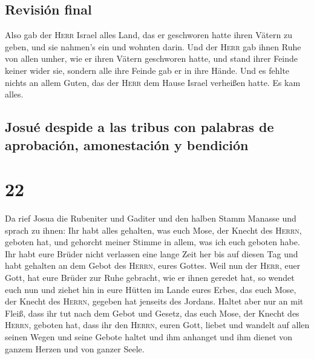 \hypertarget{revisiuxf3n-final}{%
\subsection{Revisión final}\label{revisiuxf3n-final}}

 Also gab der \textsc{Herr} Israel alles Land, das er
geschworen hatte ihren Vätern zu geben, und sie nahmen's ein und wohnten
darin.  Und der \textsc{Herr} gab ihnen Ruhe von allen
umher, wie er ihren Vätern geschworen hatte, und stand ihrer Feinde
keiner wider sie, sondern alle ihre Feinde gab er in ihre Hände.
 Und es fehlte nichts an allem Guten, das der
\textsc{Herr} dem Hause Israel verheißen hatte. Es kam alles.

\hypertarget{josuuxe9-despide-a-las-tribus-con-palabras-de-aprobaciuxf3n-amonestaciuxf3n-y-bendiciuxf3n}{%
\subsection{Josué despide a las tribus con palabras de aprobación,
amonestación y
bendición}\label{josuuxe9-despide-a-las-tribus-con-palabras-de-aprobaciuxf3n-amonestaciuxf3n-y-bendiciuxf3n}}

\hypertarget{section-21}{%
\section{22}\label{section-21}}

 Da rief Josua die Rubeniter und Gaditer und den halben
Stamm Manasse  und sprach zu ihnen: Ihr habt alles
gehalten, was euch Mose, der Knecht des \textsc{Herrn}, geboten hat, und
gehorcht meiner Stimme in allem, was ich euch geboten habe.
 Ihr habt eure Brüder nicht verlassen eine lange Zeit her
bis auf diesen Tag und habt gehalten an dem Gebot des \textsc{Herrn},
eures Gottes.  Weil nun der \textsc{Herr}, euer Gott, hat
eure Brüder zur Ruhe gebracht, wie er ihnen geredet hat, so wendet euch
nun und ziehet hin in eure Hütten im Lande eures Erbes, das euch Mose,
der Knecht des \textsc{Herrn}, gegeben hat jenseits des Jordans.
 Haltet aber nur an mit Fleiß, dass ihr tut nach dem Gebot
und Gesetz, das euch Mose, der Knecht des \textsc{Herrn}, geboten hat,
dass ihr den \textsc{Herrn}, euren Gott, liebet und wandelt auf allen
seinen Wegen und seine Gebote haltet und ihm anhanget und ihm dienet von
ganzem Herzen und von ganzer Seele.

